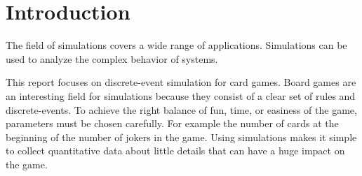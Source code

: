 
\section{Introduction}

The field of simulations covers a wide range of applications.
Simulations can be used to analyze the complex behavior of systems. 


This report focuses on discrete-event simulation for card games. Board games are an interesting field for simulations because they consist of a clear set of rules and discrete-events. To achieve the right balance of fun, time, or easiness of the game, parameters must be chosen carefully. For example the number of cards at the beginning of the number of jokers in the game. Using simulations makes it simple to collect quantitative data about little details that can have a huge impact on the game.



